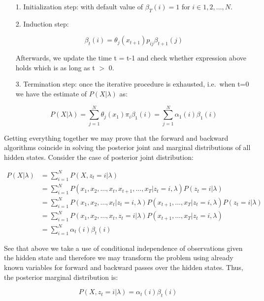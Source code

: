\begin{itemize}
\item[1.] Initialization step: with default value of $\beta_T(i) = 1$ for $i \in {1,2,\ldots,N}$. 
\item[2.] Induction step: 

\begin{equation}
\beta_t(i) = \theta_j(x_{t+1})p_{ij} \beta_{t+1}(j)
\end{equation}

Afterwards, we update the time t = t-1 and check whether expression above holds which is as long as t $>$ 0.
\item[3.] Termination step: once the iterative procedure is exhausted, i.e.\ when t=0 we have the estimate of $P(X|\lambda)$ as:

\begin{equation}
P(X|\lambda) = \sum_{j=1}^N \theta_j(x_{1})\pi_{i} \beta_{1}(i) = \sum_{j=1}^N \alpha_1(i)  \beta_{1}(i)
\end{equation}

\end{itemize}

Getting everything together we may prove that the forward and backward algorithms coincide in solving the posterior joint and marginal distributions of all hidden states. Consider the case of posterior joint distribution:

\begin{align}
P(X|\lambda) &= \sum_{i=1}^N P(X,z_t=i|\lambda) \\ \nonumber
&= \sum_{i=1}^N P(x_1,x_2,\ldots,x_{t},x_{t+1},\ldots,x_{T}|z_t=i,\lambda) P(z_t = i|\lambda) \\ \nonumber
&= \sum_{i=1}^N P(x_1,x_2,\ldots,x_{t}|z_t=i,\lambda) P(x_{t+1},\ldots,x_{T}|z_t=i,\lambda) P(z_t = i|\lambda) \\ \nonumber
&= \sum_{i=1}^N P(x_1,x_2,\ldots,x_{t},z_t=i|\lambda) P(x_{t+1},\ldots,x_{T}|z_t=i,\lambda) \\ \nonumber
&= \sum_{i=1}^N \alpha_{t}(i) \beta_t(i) 
\end{align}

See that above we take a use of conditional independence of observations given the hidden state and therefore we may transform the problem using already known variables for forward and backward passes over the hidden states. Thus, the posterior marginal distribution is:

\begin{equation}
P(X, z_t=i|\lambda) = \alpha_t(i) \beta_t(i)
\end{equation}

